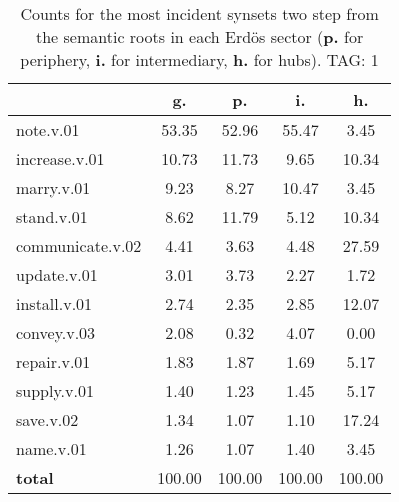 \begin{table}[h!]
\begin{center}
\begin{tabular}{| l | c | c | c | c |}\hline
 & g. & p. & i. & h. \\\hline
note.v.01 & 53.35  & 52.96  & 55.47  & 3.45 \\\hline
increase.v.01 & 10.73  & 11.73  & 9.65  & 10.34 \\\hline
marry.v.01 & 9.23  & 8.27  & 10.47  & 3.45 \\\hline
stand.v.01 & 8.62  & 11.79  & 5.12  & 10.34 \\\hline
communicate.v.02 & 4.41  & 3.63  & 4.48  & 27.59 \\\hline
update.v.01 & 3.01  & 3.73  & 2.27  & 1.72 \\\hline
install.v.01 & 2.74  & 2.35  & 2.85  & 12.07 \\\hline
convey.v.03 & 2.08  & 0.32  & 4.07  & 0.00 \\\hline
repair.v.01 & 1.83  & 1.87  & 1.69  & 5.17 \\\hline
supply.v.01 & 1.40  & 1.23  & 1.45  & 5.17 \\\hline
save.v.02 & 1.34  & 1.07  & 1.10  & 17.24 \\\hline
name.v.01 & 1.26  & 1.07  & 1.40  & 3.45 \\\hline
{{\bf total}} & 100.00  & 100.00  & 100.00  & 100.00 \\\hline
\end{tabular}
\caption{Counts for the most incident synsets two step from the semantic roots in each Erd\"os sector ({\bf p.} for periphery, {\bf i.} for intermediary, {\bf h.} for hubs). TAG: 1}
\end{center}
\end{table}